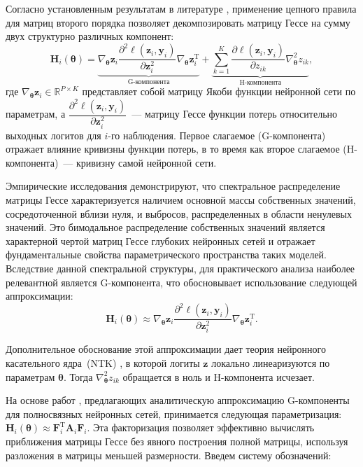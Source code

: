 Согласно установленным результатам в литературе \cite{sagun2018empiricalanalysishessianoverparametrized}, применение цепного правила для матриц второго порядка \cite{skorski2019chainruleshessianhigher} позволяет декомпозировать матрицу Гессе на сумму двух структурно различных компонент:
\[
    \mathbf{H}_{i}(\boldsymbol{\theta}) = \underbrace{\nabla_{\boldsymbol{\theta}} \mathbf{z}_i \dfrac{\partial^2 \ell(\mathbf{z}_i, \mathbf{y}_i)}{\partial \mathbf{z}_{i}^2} \nabla_{\boldsymbol{\theta}} \mathbf{z}_i^{\text{T}} }_{\text{G-компонента}} + \underbrace{\sum\limits_{k=1}^{K} \dfrac{\partial \ell(\mathbf{z}_i, \mathbf{y}_i)}{\partial z_{ik}} \nabla^2_{\boldsymbol{\theta}} z_{ik}}_{\text{H-компонента}},
\]
где $\nabla_{\boldsymbol{\theta}} \mathbf{z}_i \in \mathbb{R}^{P \times K}$ представляет собой матрицу Якоби функции нейронной сети по параметрам, а $\dfrac{\partial^2 \ell(\mathbf{z}_i, \mathbf{y}_i)}{\partial \mathbf{z}_{i}^2}$~--- матрицу Гессе функции потерь относительно выходных логитов для $i$-го наблюдения. Первое слагаемое (G-компонента) отражает влияние кривизны функции потерь, в то время как второе слагаемое (H-компонента)~--- кривизну самой нейронной сети.

Эмпирические исследования \cite{pmlr-v97-ghorbani19b,sagun2018empiricalanalysishessianoverparametrized,papyan2019spectrumdeepnethessiansscale} демонстрируют, что спектральное распределение матрицы Гессе характеризуется наличием основной массы собственных значений, сосредоточенной вблизи нуля, и выбросов, распределенных в области ненулевых значений. Это бимодальное распределение собственных значений является характерной чертой матриц Гессе глубоких нейронных сетей и отражает фундаментальные свойства параметрического пространства таких моделей. Вследствие данной спектральной структуры, для практического анализа наиболее релевантной является G-компонента, что обосновывает использование следующей аппроксимации:
\[
    \mathbf{H}_{i}(\boldsymbol{\theta}) \approx \nabla_{\boldsymbol{\theta}} \mathbf{z}_i \dfrac{\partial^2 \ell(\mathbf{z}_i, \mathbf{y}_i)}{\partial \mathbf{z}_{i}^2} \nabla_{\boldsymbol{\theta}} \mathbf{z}_i^{\text{T}}.
\]

Дополнительное обоснование этой аппроксимации дает теория нейронного касательного ядра~(NTK) \cite{NEURIPS2018_5a4be1fa,Lee_2020}, в которой логиты $\mathbf{z}$ локально линеаризуются по параметрам $\boldsymbol{\theta}$. Тогда $\nabla^2_{\boldsymbol{\theta}} z_{ik}$ обращается в ноль и H-компонента исчезает.

На основе работ \cite{wu2022dissecting}, предлагающих аналитическую аппроксимацию G-компоненты для полносвязных нейронных сетей, принимается следующая параметризация: $\mathbf{H}_{i}(\boldsymbol{\theta}) \approx \mathbf{F}_i^{\text{T}} \mathbf{A}_i \mathbf{F}_i$.
Эта факторизация позволяет эффективно вычислять приближения матрицы Гессе без явного построения полной матрицы, используя разложения в матрицы меньшей размерности.
Введем систему обозначений:

